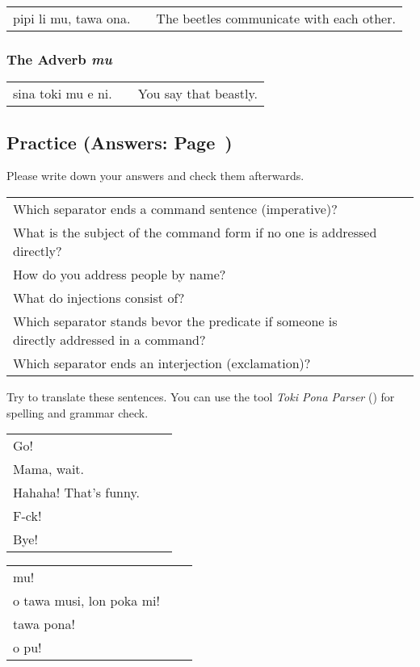 \begin{supertabular}{p{5,5cm}|ll}
pipi li mu, tawa ona. && The beetles communicate with each other. \\
\end{supertabular} 

%
\subsubsection*{The Adverb \textit{mu}}

\begin{supertabular}{p{5,5cm}|ll}
sina toki mu e ni. && You say that beastly. \\
\end{supertabular} 

%
%
%
%
\newpage
%
\subsection*{Practice (Answers: Page~\pageref{'commands_interjections'})}
%
Please write down your answers and check them afterwards. 

\begin{supertabular}{p{5,5cm}|ll}
Which separator ends a command sentence (imperative)? &&  \\ %
What is the subject of the command form if no one is addressed directly? &&  \\ %
How do you address people by name? &&  \\ %
What do injections consist of? &&  \\ %
Which separator stands bevor  the predicate if someone is directly addressed in a command? &&  \\ %
Which separator ends an interjection (exclamation)? &&  \\ %
\end{supertabular}

Try to translate these sentences. 
You can use the tool \textit{Toki Pona Parser} (\cite{www:rowa:02}) for spelling and grammar check. 

\begin{supertabular}{p{5,5cm}|ll}
Go!  &&  \\ %
Mama, wait.  &&  \\ %
Hahaha! That's funny.  &&  \\ %
F-ck! &&  \\ %
Bye!  &&  \\ %
\end{supertabular}

\begin{supertabular}{p{5,5cm}|ll}
mu!  &&  \\ %
o tawa musi, lon poka mi!  &&  \\ %
tawa pona!  &&  \\ %
o pu! &&  \\ %
\end{supertabular} 

%
